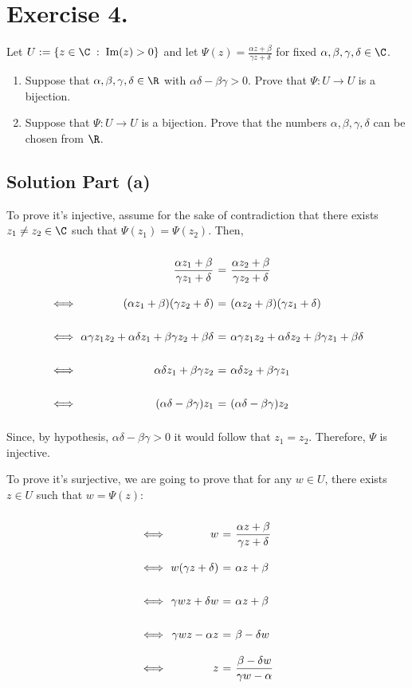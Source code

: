 \section*{Exercise 4.}
Let $U := \{ z \in\C \;:\; \mbox{Im}(z) > 0\}$ and let $\Psi(z) = \frac{\alpha z + \beta}{\gamma z + \delta}$ for fixed $\alpha,\beta,\gamma,\delta \in \C$.

\begin{enumerate}[label=(\alph*)]
    \item Suppose that $\alpha,\beta,\gamma,\delta \in \R$ with $\alpha\delta - \beta\gamma > 0$. Prove that $\Psi : U\to U$ is a bijection.
    \item Suppose that $\Psi: U \to U$ is a bijection. Prove that the numbers $\alpha, \beta, \gamma,\delta$ can be chosen from $\R$.
\end{enumerate}

\subsection*{Solution Part (a)}
To prove it's injective, assume for the sake of contradiction that there exists $z_1 \neq z_2 \in \C$ such that $\Psi(z_1) = \Psi(z_2)$. Then, 

\[ \everymath{\displaystyle}
\arraycolsep=1.8pt\def\arraystretch{2.5}
\begin{array}{rrcl}
     & \frac{\alpha z_1 + \beta}{\gamma z_1 + \delta} & = & \frac{\alpha z_2 + \beta}{\gamma z_2 + \delta}\\
     \iff & (\alpha z_1 + \beta)(\gamma z_2 + \delta) & = & (\alpha z_2 + \beta)(\gamma z_1 + \delta)\\
     \iff & \alpha\gamma z_1z_2  + \alpha\delta z_1 + \beta\gamma z_2 + \beta \delta & = & \alpha\gamma z_1z_2  + \alpha\delta z_2 + \beta\gamma z_1 + \beta \delta\\
     \iff & \alpha\delta z_1 + \beta\gamma z_2 & = & \alpha\delta z_2 + \beta\gamma z_1\\
     \iff & (\alpha\delta - \beta \gamma) z_1 & = & (\alpha\delta - \beta \gamma) z_2
\end{array} \]

Since, by hypothesis, $\alpha\delta - \beta\gamma > 0$ it would follow that $z_1 = z_2$. Therefore, $\Psi$ is injective.

To prove it's surjective, we are going to prove that for any $w \in U$, there exists $z \in U$ such that $w = \Psi(z)$:

\[ \everymath{\displaystyle}
\arraycolsep=1.8pt\def\arraystretch{2.5}
\begin{array}{rrcl}
    \iff & w & = & \frac{\alpha z + \beta}{\gamma z + \delta}\\
    \iff & w (\gamma z + \delta) & = & \alpha z + \beta\\
    \iff & \gamma wz + \delta w & = & \alpha z + \beta\\
    \iff & \gamma wz - \alpha z & = & \beta - \delta w\\
    \iff & z & = & \frac{\beta-\delta w}{\gamma w - \alpha}
\end{array} \]

